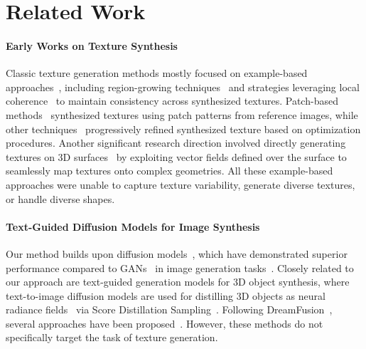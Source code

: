 \section{Related Work}

\paragraph{Early Works on Texture Synthesis}
Classic texture generation methods mostly focused on example-based approaches~\cite{Wei:2009:STARtexture}, 
including region-growing techniques~\cite{Efros:1999:texture, Wei:2000:Fast} and strategies leveraging local
coherence~\cite{Ashikhmin:2001:Synthesizing, Tong:2002:BTF} to maintain consistency across synthesized 
textures. Patch-based methods~\cite{Efros:2001:Quilting, Kwatra:2003:Graphcuttex} 
synthesized textures using patch patterns from reference images, while other
techniques~\cite{Kwatra:2005:TextureOptim, Han:2006:FastOptim} progressively refined 
synthesized texture based on optimization procedures. Another significant research direction involved directly generating textures on 3D 
surfaces~\cite{Turk:2001:Surfaces, Zhang:2006:vector, Fisher:2007:Design} by exploiting vector 
fields defined over the surface to seamlessly map textures onto complex geometries. All these example-based approaches were unable to capture texture variability, generate diverse textures, or handle diverse shapes.


\paragraph{Text-Guided Diffusion Models for Image Synthesis}
Our method builds upon diffusion models~\cite{Sohl:2015:Deep, Ho:2020:Denoising, Zhang:2023:T2I}, which have demonstrated superior performance compared to GANs~\cite{Goodfellow:2014:GAN, Zhu:2017:unpaired} in image generation tasks~\cite{Rombach:2022:High, Nichol:2021:glide, Saharia:2022:imagen, Ramesh:2022:dalle, 
Zhang:2023:ControlNet}. 
Closely related to our approach are text-guided generation models for 3D object synthesis, 
where text-to-image diffusion models are used for distilling 3D objects as neural radiance 
fields~\cite{Mildenhall:2020:nerf, Kerbl:2023:3Dgaussians} via Score Distillation 
Sampling~\cite{Poole:2022:Dreamfusion, Wang:2023:score}. Following DreamFusion~\cite{Poole:2022:Dreamfusion}, several approaches have been proposed~\cite{Lin:2023:Magic3D, 
Metzer:2023:latentnerf, Chen:2024:text2gs, Wang:2024:Prolificdreamer, Tsalicoglou:2024:textmesh, 
Shi:2024:mvdream}. However, these methods do not specifically target the task of texture generation.

